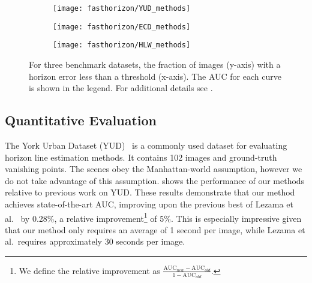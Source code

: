 \begin{figure*}[]
  \centering
  \begin{subfigure}{.30\linewidth}
    \centering
    \texttt{[image: fasthorizon/YUD\_methods]}
    \label{fig:horError_YUD}
  \end{subfigure}
  \hfill
  \begin{subfigure}{.3\linewidth}
    \centering
    \texttt{[image: fasthorizon/ECD\_methods]}
    \label{fig:horError_ECD}
  \end{subfigure}
  \hfill
  \begin{subfigure}{.3\linewidth}
    \centering
    \texttt{[image: fasthorizon/HLW\_methods]}
    \label{fig:hlw_err}
  \end{subfigure}
  \caption{For three benchmark datasets, the fraction of images
    (y-axis) with a horizon error less than a threshold (x-axis). The
    AUC for each curve is shown in the legend. For additional details see .}
  \label{fig:horError}
\end{figure*}

\subsection{Quantitative Evaluation}


The York Urban Dataset (YUD)~\cite{edgebased2008} is a commonly used dataset
for evaluating horizon line estimation methods. It contains 102 images
and ground-truth vanishing points. The scenes obey the Manhattan-world
assumption, however we do not take advantage of this assumption.
 shows the performance of our methods relative to
previous work on YUD. These results demonstrate that our method
achieves state-of-the-art AUC, improving upon the previous best of
Lezama et al.~\cite{alignment2014} by 0.28\%, a relative
improvement\footnote{We define the relative improvement as
$\frac{\text{AUC}_{new} - \text{AUC}_{old}}{1 - \text{AUC}_{old}}$.} of
5\%. This is especially impressive given that our method only requires
an average of 1 second per image, while Lezama et al.\ requires
approximately 30 seconds per image.


